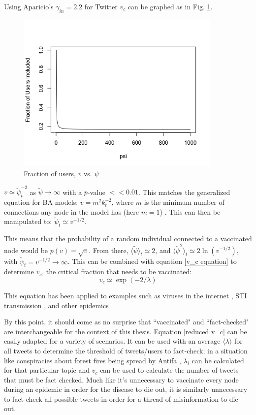 \documentclass[preprint,review,12pt]{elsarticle}
\begin{document}
Using Aparicio's $\gamma_{in} = 2.2$ for Twitter \cite{aparicio2015model} $v_c$ can be graphed as in Fig. \ref{fig:Fraction of users,v, vs. tildepsi}.
\begin{figure}[h]
 \centering
  \includegraphics[width=10cm]{Fraction of users included.png}
  \caption{Fraction of users, $v$ vs. $\psi$}\label{fig:Fraction of users,v, vs. tildepsi}
 \end{figure}

$v \simeq \tilde{\psi}_t^{-2}$ as $\tilde{\psi} \rightarrow \infty$ with a $p$-value $<< 0.01$. This matches the generalized equation for BA models: $v = m^2k_t^{-2}$, where $m$ is the minimum number of connections any node in the model has (here $m = 1$) \citep{pastor2001epidemic}. This can then be manipulated to: $\tilde{\psi}_t \simeq v^{-1/2}$. 

This means that the probability of a random individual connected to a vaccinated node would be $p(v) = \sqrt{v}$. From there, $\langle \tilde{\psi} \rangle_t \simeq 2$, and $\langle \tilde{\psi}^2 \rangle_t \simeq 2 \ln(v^{-1/2})$, with $\tilde{\psi}_t = v^{-1/2} \rightarrow \infty$. This can be combined with equation \ref{v_c equation} to determine $v_c$, the critical fraction that needs to be vaccinated:
\begin{equation}
\label{reduced v_c} 
    v_c \simeq \exp{(-2/\lambda)}
\end{equation}

This equation has  been applied to examples such as viruses in the internet \citep{kephart1993computers}, STI transmission \citep{anderson1992infectious,lloyd2001viruses}, and other epidemics \citep{diekmann2000mathematical}. 

By this point, it should come as no surprise that ``vaccinated" and ``fact-checked" are interchangeable for the context of this thesis. Equation \ref{reduced v_c} can be easily adapted for a variety of scenarios. It can be used with an average $\langle \lambda \rangle$ for all tweets to determine the threshold of tweets/users to fact-check; in a situation like conspiracies about forest fires being spread by Antifa \citep{robinson2020oregon}, $\lambda_i$ can be calculated for that particular topic and $v_c$ can be used to calculate the number of tweets that must be fact checked. Much like it's unnecessary to vaccinate every node during an epidemic in order for the disease to die out, it is similarly unnecessary to fact check all possible tweets in order for a thread of misinformation to die out. 
\end{document}

